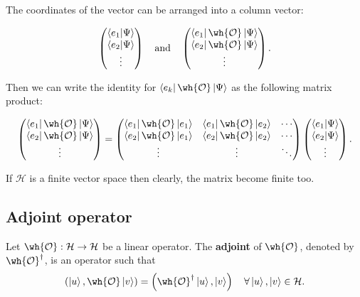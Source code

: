 \documentclass[12pt, a4paper]{article}
\begin{document}
The coordinates of the vector can be arranged into a column vector:

\[\begin{pmatrix}
    \bra{e_1} \ket{\Psi} \\
    \bra{e_2} \ket{\Psi} \\
    \vdots 
\end{pmatrix} \quad \text{and} \quad \begin{pmatrix}
    \bra{e_1} \wh{\mathcal{O}} \ket{\Psi} \\
    \bra{e_2} \wh{\mathcal{O}} \ket{\Psi} \\
    \vdots 
\end{pmatrix}.\]

Then we can write the identity for \(\bra{e_k} \wh{\mathcal{O}} \ket{\Psi}\) as the following matrix product:

\[
    \begin{pmatrix}
        \bra{e_1} \wh{\mathcal{O}} \ket{\Psi} \\
        \bra{e_2} \wh{\mathcal{O}} \ket{\Psi} \\
        \vdots 
    \end{pmatrix}
    =
    \begin{pmatrix}
        \bra{e_1} \wh{\mathcal{O}} \ket{e_1} & \bra{e_1} \wh{\mathcal{O}} \ket{e_2} & \cdots \\
        \bra{e_2} \wh{\mathcal{O}} \ket{e_1} & \bra{e_2} \wh{\mathcal{O}} \ket{e_2} & \cdots \\
        \vdots & \vdots & \ddots
    \end{pmatrix}
    \begin{pmatrix}
        \bra{e_1} \ket{\Psi} \\
        \bra{e_2} \ket{\Psi} \\
        \vdots 
    \end{pmatrix}.
\]

\begin{mdremark}
    If \(\mathcal{H}\) is a finite vector space then clearly, the matrix become finite too.
\end{mdremark}

\subsection{Adjoint operator}

\begin{definition}
    Let \(\wh{\mathcal{O}} : \mathcal{H} \to \mathcal{H}\) be a linear operator. The \textbf{adjoint} of \(\wh{\mathcal{O}}\), denoted by \({\wh{\mathcal{O}}}^{\dagger}\), is an operator such that 
    \[\left( \ket{u}, \wh{\mathcal{O}}\ket{v} \right) = \left( {\wh{\mathcal{O}}}^{\dagger} \ket{u}, \ket{v} \right) \quad \forall \ket{u},\ket{v} \in \mathcal{H}.\]
\end{definition}
\end{document}
